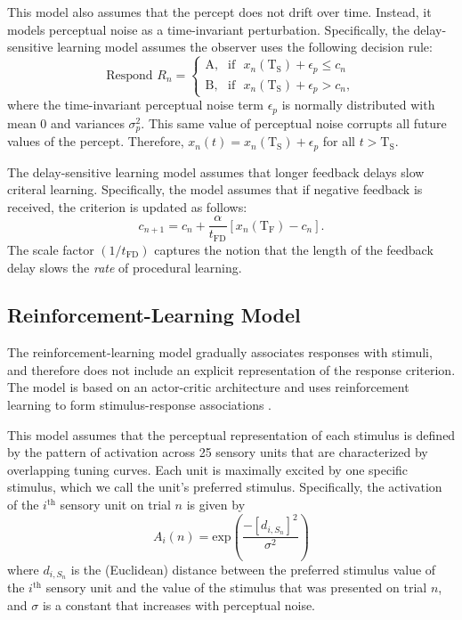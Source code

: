 \documentclass[doc, floatsintext]{apa7}
\begin{document}
This model also assumes that the percept does not drift over
time. Instead, it models perceptual noise as a
time-invariant perturbation. Specifically, the
delay-sensitive learning model assumes the observer uses the
following decision rule:
\begin{equation}
  \text{Respond } R_n =
  \begin{cases}
    \text{A}, & \text{if ~} x_n(\text{T}_\text{S}) + \epsilon_p \leq c_n  \\
    \text{B}, & \text{if ~} x_n(\text{T}_\text{S}) + \epsilon_p > c_n,
  \end{cases}
  \label{eq:DR}
\end{equation}
where the time-invariant perceptual noise term $\epsilon_p$
is normally distributed with mean 0 and variances
$\sigma_p^2$. This same value of perceptual noise corrupts
all future values of the percept. Therefore, $x_n(t) =
x_n(\text{T}_\text{S}) + \epsilon_p$ for all $t >
\text{T}_\text{S}$.

The delay-sensitive learning model assumes that longer
feedback delays slow criteral learning. Specifically, the
model assumes that if negative feedback is received, the
criterion is updated as follows:
\begin{equation}
  c_{n+1} = c_n + \frac{\alpha}{t_\text{FD}} [x_n(\text{T}_\text{F}) - c_n].
  \label{eq:DSL_learning}
\end{equation}
The scale factor $(1/t_\text{FD})$ captures the notion that
the length of the feedback delay slows the \textit{rate} of
procedural learning.

\subsection{Reinforcement-Learning Model}
The reinforcement-learning model gradually associates
responses with stimuli, and therefore does not include an
explicit representation of the response criterion. The model
is based on an actor-critic architecture and uses
reinforcement learning to form stimulus-response
associations \parencite{SuttonBarto1998}.

This model assumes that the perceptual representation of
each stimulus is defined by the pattern of activation across
25 sensory units that are characterized by overlapping
tuning curves. Each unit is maximally excited by one
specific stimulus, which we call the unit's preferred
stimulus. Specifically, the activation of the $i^\text{th}$
sensory unit on trial $n$ is given by
\begin{equation}
  A_i(n) = \text{exp} \left( \frac{-\left[d_{i,S_n}\right]^2}{\sigma^2} \right)
\end{equation}
where $d_{i,S_n}$ is the (Euclidean) distance between the preferred
stimulus value of the $i^\text{th}$ sensory unit and the
value of the stimulus that was presented on trial $n$, and
$\sigma$ is a constant that increases with perceptual noise.
\end{document}

